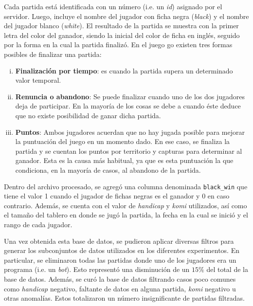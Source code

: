 \documentclass[11pt,twoside,spanish]{report} %
\begin{document}
Cada partida est\'a identificada con un n\'umero (i.e. un \textit{id}) asignado por el servidor.
Luego, incluye el nombre del jugador con ficha negra (\textit{black}) y el nombre del jugador blanco (\textit{white}).
El resultado de la partida se muestra con la primer letra del color del ganador, siendo la inicial del color de ficha en ingl\'es, seguido por la forma en la cual la partida finaliz\'o.
En el juego go existen tres formas posibles de finalizar una partida:
\begin{enumerate}[i)]
\item \textbf{Finalizaci\'on por tiempo}: es cuando  la partida supera un determinado valor temporal.

\item \textbf{Renuncia o abandono}: Se puede finalizar cuando uno de los dos jugadores deja de participar. En la mayor\'ia de los cosas se debe a cuando \'este  deduce que no existe posibilidad de ganar dicha partida.

\item \textbf{Puntos}: Ambos jugadores acuerdan que no hay jugada posible para mejorar la puntuaci\'on del juego en un momento dado.
En ese caso, se finaliza la partida y se cuentan los puntos por territorio y capturas para determinar al ganador.
Esta es la causa m\'as habitual, ya que es esta puntuaci\'on la que condiciona, en la mayor\'ia de casos, al abandono de la partida.
\end{enumerate}

Dentro del archivo procesado, se agreg\'o una columna denominada \texttt{black\_win} que tiene el valor 1 cuando el jugador de fichas negras es el ganador y 0 en caso contrario.
Adem\'as, se cuenta con el valor de \textit{handicap} y \textit{komi} utilizados, as\'i como el tama\~no del tablero en donde se jug\'o la partida, la fecha en la cual se inici\'o y el rango de cada jugador.

Una vez obtenida esta base de datos, se pudieron aplicar diversas filtros para generar los subconjuntos de datos utilizados en los diferentes experimentos.
En particular, se eliminaron todas las partidas donde uno de los jugadores era un programa (i.e. un \emph{bot}).
Esto represent\'o una disminuci\'on de un $15\%$ del total de la base de datos.
Adem\'as, se cur\'o la base de datos filtrando casos poco comunes como \textit{handicap} negativo, faltante de datos en alguna partida, \textit{komi} negativo u otras anomal\'ias.
Estos totalizaron un n\'umero insignificante de partidas filtradas.
\end{document}
